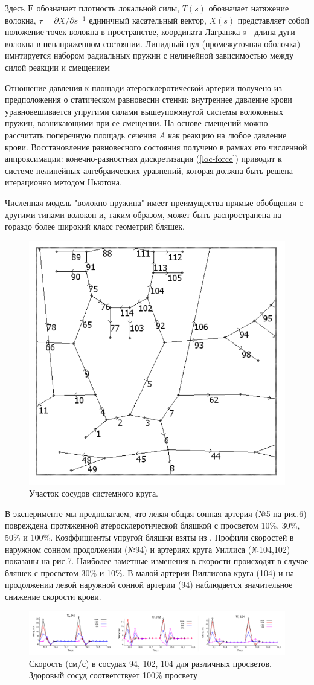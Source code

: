 Здесь $\mathbf{F}$ обозначает плотность локальной силы, $T(s)$ обозначает натяжение волокна, $\tau =\partial X/\partial s^{-1}$ единичный касательный вектор, $X(s)$ представляет собой положение точек волокна в пространстве, координата Лагранжа s - длина дуги волокна в ненапряженном состоянии. Липидный пул (промежуточная оболочка) имитируется набором радиальных пружин с нелинейной зависимостью между силой реакции и смещением

Отношение давления к площади атеросклеротической артерии получено из предположения о статическом равновесии стенки: внутреннее давление крови уравновешивается упругими силами вышеупомянутой системы волоконных пружин, возникающими при ее смещении. На основе смещений можно рассчитать поперечную площадь сечения $A$ как реакцию на любое давление крови. 
Восстановление равновесного состояния получено в рамках его численной аппроксимации: конечно-разностная дискретизация (\ref{loc-force}) приводит к системе нелинейных алгебраических уравнений, которая должна быть решена итерационно методом Ньютона.

Численная модель "волокно-пружина" имеет преимущества прямые обобщения с другими 
типами волокон и, таким образом, может быть распространена на гораздо более широкий 
класс геометрий бляшек.

\begin{figure}[h]
\centering
\includegraphics[width=0.4\linewidth]{chast.png}
\caption{Участок сосудов системного круга.}
\label{fig:mpr}
\end{figure}

В эксперименте мы предполагаем, что левая общая сонная артерия (№5 на рис.6) 
повреждена протяженной атеросклеротической бляшкой с просветом 10\%, 30\%, 50\% и 
100\%. Коэффициенты упругой бляшки взяты из \cite{vassilevski:2011}. Профили скоростей в наружном 
сонном продолжении (№94) и артериях круга Уиллиса (№104,102) показаны на рис.7. 
Наиболее заметные изменения в скорости происходят в случае бляшек с просветом 30\% и 
10\%. В малой артерии Виллисова круга (104) и на продолжении левой наружной сонной 
артерии (94) наблюдается значительное снижение скорости крови.

\begin{figure}[h]
\centering
\includegraphics[width=0.9\linewidth]{grap.png}
\caption{Скорость (см/с) в сосудах 94, 102, 104 для различных просветов. Здоровый сосуд
соответствует 100\% просвету}
\label{fig:mpr}
\end{figure}
